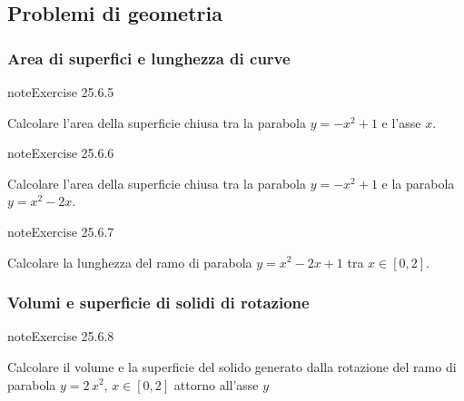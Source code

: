 \documentclass[letterpaper,10pt,italian]{jupyterBook}
\begin{document}
\subsection{Problemi di geometria}
\label{\detokenize{ch/infinitesimal_calculus/integrals-problems:problemi-di-geometria}}

\subsubsection{Area di superfici e lunghezza di curve}
\label{\detokenize{ch/infinitesimal_calculus/integrals-problems:area-di-superfici-e-lunghezza-di-curve}} \label{exercise:ch/infinitesimal_calculus/integrals-problems-exercise-4}

\begin{sphinxadmonition}{note}{Exercise 25.6.5}



\sphinxAtStartPar
Calcolare l’area della superficie chiusa tra la parabola \(y = - x^2 + 1\) e l’asse \(x\).
\end{sphinxadmonition}
 \label{exercise:ch/infinitesimal_calculus/integrals-problems-exercise-5}

\begin{sphinxadmonition}{note}{Exercise 25.6.6}



\sphinxAtStartPar
Calcolare l’area della superficie chiusa tra la parabola \(y = - x^2 + 1\) e la parabola \(y = x^2 - 2 x\).
\end{sphinxadmonition}
 \label{exercise:ch/infinitesimal_calculus/integrals-problems-exercise-6}

\begin{sphinxadmonition}{note}{Exercise 25.6.7}



\sphinxAtStartPar
Calcolare la lunghezza del ramo di parabola \(y = x^2 - 2x + 1\) tra \(x \in [0,2]\).
\end{sphinxadmonition}


\subsubsection{Volumi e superficie di solidi di rotazione}
\label{\detokenize{ch/infinitesimal_calculus/integrals-problems:volumi-e-superficie-di-solidi-di-rotazione}} \label{exercise:ch/infinitesimal_calculus/integrals-problems-exercise-7}

\begin{sphinxadmonition}{note}{Exercise 25.6.8}





\sphinxAtStartPar
Calcolare il volume e la superficie del solido generato dalla rotazione del ramo di parabola \(y = 2\, x^2\), \(x \in [0,2]\) attorno all’asse \(y\)
\end{sphinxadmonition}
 \label{exercise:ch/infinitesimal_calculus/integrals-problems-exercise-8}
\end{document}
